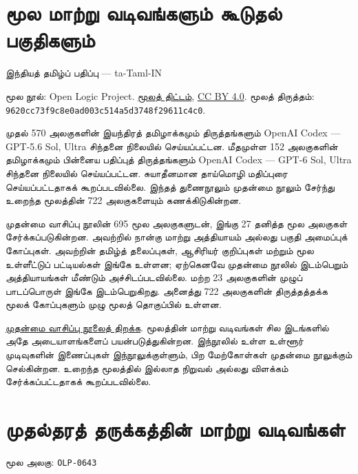 \documentclass[11pt,a4paper,openany]{memoir}
\begin{document}
\raggedright
\pagestyle{plain}
\chapter*{மூல மாற்று வடிவங்களும் கூடுதல் பகுதிகளும்}
\noindent இந்தியத் தமிழ்ப் பதிப்பு — ta-Taml-IN

\noindent மூல நூல்: Open Logic Project.
\href{https://github.com/OpenLogicProject/OpenLogic}{மூலத் திட்டம்},
\href{https://creativecommons.org/licenses/by/4.0/}{CC BY 4.0}.
மூலத் திருத்தம்: \texttt{9620cc73f9c8e0ad003c514a5d3748f29611c4c0}.

\noindent முதல் 570 அலகுகளின் இயந்திரத் தமிழாக்கமும் திருத்தங்களும்
OpenAI Codex — GPT-5.6 Sol, Ultra சிந்தனை நிலையில் செய்யப்பட்டன.
மீதமுள்ள 152 அலகுகளின் தமிழாக்கமும் பின்னைய பதிப்புத் திருத்தங்களும்
OpenAI Codex — GPT-6 Sol, Ultra சிந்தனை நிலையில் செய்யப்பட்டன.
சுயாதீனமான தாய்மொழி மதிப்புரை செய்யப்பட்டதாகக் கூறப்படவில்லை.
இந்தத் துணைநூலும் முதன்மை நூலும்
சேர்ந்து உறைந்த மூலத்தின் 722 அலகுகளையும் கணக்கிடுகின்றன.

\noindent முதன்மை வாசிப்பு நூலின் 695 மூல அலகுகளுடன்,
இங்கு 27 தனித்த மூல அலகுகள் சேர்க்கப்படுகின்றன.
அவற்றில் நான்கு மாற்று அத்தியாயம் அல்லது பகுதி அமைப்புக் கோப்புகள்.
அவற்றின் தமிழ்த் தலைப்புகள், ஆசிரியர் குறிப்புகள் மற்றும் மூல
உள்ளீட்டுப் பட்டியல்கள் இங்கே உள்ளன; ஏற்கெனவே முதன்மை நூலில்
இடம்பெறும் அத்தியாயங்கள் மீண்டும் அச்சிடப்படவில்லை.
மற்ற 23 அலகுகளின் முழுப் பாடப்பொருள் இங்கே இடம்பெறுகிறது.
அனைத்து 722 அலகுகளின் திருத்தத்தக்க மூலக் கோப்புகளும்
முழு மூலத் தொகுப்பில் உள்ளன.

\noindent \href{tamil-complete.pdf}{முதன்மை வாசிப்பு நூலைத் திறக்க}.
மூலத்தின் மாற்று வடிவங்கள் சில இடங்களில் அதே அடையாளங்களைப்
பயன்படுத்துகின்றன. இந்நூலில் உள்ள உள்ளூர் முடிவுகளின் இணைப்புகள்
இந்நூலுக்குள்ளும், பிற மேற்கோள்கள் முதன்மை நூலுக்கும் செல்கின்றன.
உறைந்த மூலத்தில் இல்லாத நிறுவல் அல்லது விளக்கம் சேர்க்கப்பட்டதாகக்
கூறப்படவில்லை.

\clearpage
\begingroup
\sloppy
\renewcommand{\cftsectionfont}{\small}
\tableofcontents*
\endgroup
\chapter{முதல்தரத் தருக்கத்தின் மாற்று வடிவங்கள்}
\clearpage
\noindent மூல அலகு: \texttt{OLP-0643}\par

\end{document}
